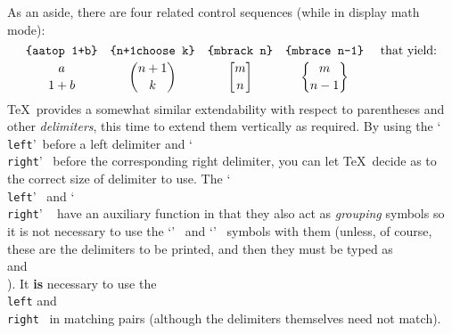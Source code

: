 As an aside, there are four related control sequences (while in display math mode):
$$\vbox{\halign{\hfil#\hfil&&\quad \hfil#\hfil\cr
{\tt \lbr a\\atop 1+b\rbr}&
{\tt \lbr n+1\\choose k\rbr}&
{\tt \lbr m\\brack n\rbr}&
{\tt \lbr m\\brace n-1\rbr}&\ that yield:\cr
\noalign{\smallskip}
{$\displaystyle{a\atop 1+b}$}&
{$\displaystyle{n+1\choose k}$}&
{$\displaystyle{m\brack n}$}&
{$\displaystyle{m\brace n-1}$}\cr}}$$
\TeX\ provides a somewhat similar extendability with respect to parentheses and
other {\sl delimiters}, this time to extend them vertically as required.
By using the \css\/ `{\tt \\left}'\ before a left
delimiter and `{\tt \\right}' \ before the corresponding right delimiter,
you can let \TeX\ decide as to the correct size of delimiter to use.  The
`{\tt \\left}' \ and `{\tt \\right}' \ \css\/ have an auxiliary function
in that they also act as {\sl grouping} symbols so it is not necessary to
use the `{\tt \lbr}' \ and `{\tt \rbr}' \ symbols with them (unless, of course,
these are the delimiters to be printed, and then they must be typed
as {\tt \\\lbr} and {\tt \\\rbr}).
It {\bf is} necessary to use the {\tt \\left} and {\tt \\right} \css\/\ 
in matching pairs (although the delimiters themselves need not match).

